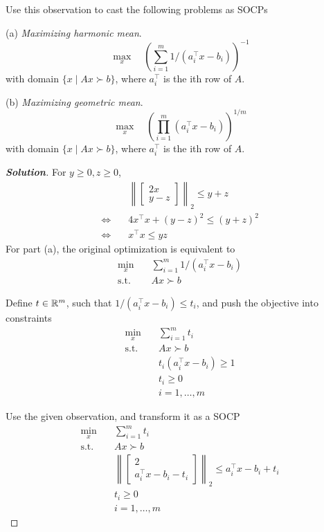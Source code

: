 \documentclass[11pt]{article}
\newenvironment{solution}
  {\renewcommand\qedsymbol{$\square$}\begin{proof}[\textbf{Solution}]}
  {\end{proof}}
\newcommand{\T}{^\top}
\begin{document}
Use this observation to cast the following problems as SOCPs

(a) \textit{Maximizing harmonic mean}.
\[
\max_x\quad \left(\sum_{i=1}^{m} 1/(a_i\T x - b_i)\right)^{-1}
\]
with domain $\{x\mid Ax\succ b\}$, where $a_i\T$ is the ith row of $A$.


(b) \textit{Maximizing geometric mean}.
\[
\max_x\quad \left(\prod_{i=1}^{m} (a_i\T x - b_i)\right)^{1/m}
\]
with domain $\{x\mid Ax\succ b\}$, where $a_i\T$ is the ith row of $A$.

\begin{solution}
  For $y\geq 0, z\geq 0$, 
  \begin{align*}
    &\left\|\begin{bmatrix}
      2x\\ y-z
    \end{bmatrix}\right\|_2 
    \leq y+z\\
    \Leftrightarrow\quad & 4x\T x + (y-z)^2 \leq (y+z)^2\\
    \Leftrightarrow\quad & x\T x \leq yz
  \end{align*}
  For part (a), the original optimization is equivalent to
  \begin{align*}
    \min_x\quad &\sum_{i=1}^{m} 1/(a_i\T x - b_i)\\
    \text{s.t.}\quad & Ax\succ b
  \end{align*}
  
  Define $t\in{{\mathbb{R}}}^m$, such that $1/(a_i\T x - b_i) \leq t_i$, and push the objective into constraints
  \begin{align*}
    \min_x\quad & \sum_{i=1}^{m}t_i\\
    \text{s.t.}\quad & Ax\succ b\\
    & t_i (a_i\T x - b_i) \geq 1\\
    & t_i \geq 0\\
    & i = 1, \dots, m
  \end{align*}

  Use the given observation, and transform it as a SOCP
  \begin{align*}
    \min_x\quad & \sum_{i=1}^{m}t_i\\
    \text{s.t.}\quad & Ax\succ b\\
    & \left\|\begin{bmatrix}
      2 \\ a_i\T x - b_i - t_i
    \end{bmatrix}
    \right\|_2
    \leq a_i\T x - b_i + t_i\\
    & t_i \geq 0\\
    & i = 1, \dots, m
  \end{align*}
\end{solution}
\end{document}
